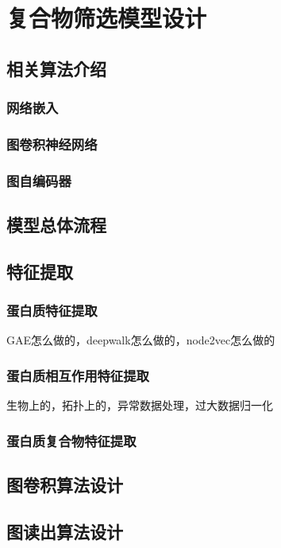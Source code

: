 \chapter{复合物筛选模型设计}
\label{chapter:gcnfilter}

\section{相关算法介绍}
\label{section:arithmetic}
\subsection{网络嵌入}
\label{subsection:nodeEmbedding}
\subsection{图卷积神经网络}
\label{subsection:GCN}
\subsection{图自编码器}
\label{subsection:GAE}
\section{模型总体流程}
\label{section:progress}
\section{特征提取}
\label{section:allfeat}
\subsection{蛋白质特征提取}
\label{subsection:nodefeat}
GAE怎么做的，deepwalk怎么做的，node2vec怎么做的
\subsection{蛋白质相互作用特征提取}
\label{subsection:edgefeat}
生物上的，拓扑上的，异常数据处理，过大数据归一化
\subsection{蛋白质复合物特征提取}
\label{subsection:graphfeat}
\section{图卷积算法设计}
\label{section:myGCN}
\section{图读出算法设计}
\label{section:GPool}
